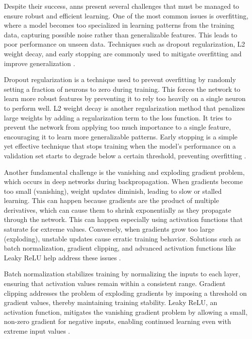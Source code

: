 Despite their success, \ac{ann}s present several challenges that must be managed to ensure robust and efficient learning.
One of the most common issues is overfitting, where a model becomes too specialized in learning patterns from the training data, capturing possible noise rather than generalizable features.
This leads to poor performance on unseen data.
Techniques such as dropout regularization, L2 weight decay, and early stopping are commonly used to mitigate overfitting and improve generalization \cite{pytorchPyTorch,glorot2010understanding}.

Dropout regularization is a technique used to prevent overfitting by randomly setting a fraction of neurons to zero during training.
This forces the network to learn more robust features by preventing it to rely too heavily on a single neuron to perform well.
L2 weight decay is another regularization method that penalizes large weights by adding a regularization term to the loss function.
It tries to prevent the network from applying too much importance to a single feature, encouraging it to learn more generalizable patterns.
Early stopping is a simple yet effective technique that stops training when the model's performance on a validation set starts to degrade below a certain threshold, preventing overfitting \cite{pytorchPyTorch,glorot2010understanding}.

Another fundamental challenge is the vanishing and exploding gradient problem, which occurs in deep networks during backpropagation.
When gradients become too small (vanishing), weight updates diminish, leading to slow or stalled learning.
This can happen because gradients are the product of multiple derivatives, which can cause them to shrink exponentially as they propagate through the network.
This can happen especially using activation functions that saturate for extreme values.
Conversely, when gradients grow too large (exploding), unstable updates cause erratic training behavior.
Solutions such as batch normalization, gradient clipping, and advanced activation functions like Leaky ReLU help address these issues \cite{pytorchPyTorch,glorot2010understanding}.

Batch normalization stabilizes training by normalizing the inputs to each layer, ensuring that activation values remain within a consistent range.
Gradient clipping addresses the problem of exploding gradients by imposing a threshold on gradient values, thereby maintaining training stability.
Leaky ReLU, an activation function, mitigates the vanishing gradient problem by allowing a small, non-zero gradient for negative inputs, enabling continued learning even with extreme input values \cite{pytorchPyTorch,glorot2010understanding}.

